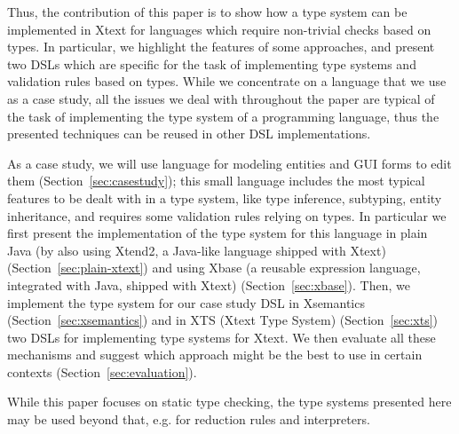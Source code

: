 Thus, the contribution of this paper is to show how a type system can be
implemented in Xtext for languages  which require non-trivial checks based on types. In particular, we
highlight the features of some approaches, and present two DSLs which are
specific for the task of implementing type systems and validation rules based on
types.   While we concentrate on a language that we use as a case study, all the
issues we deal with throughout the paper are typical of the task of implementing
the type system of a programming language, thus the presented techniques can be
reused in other DSL implementations. 

As a case study, we will use language for modeling entities and GUI forms to
edit them (Section~\ref{sec:casestudy}); this small language includes the most
typical features to be dealt with in a type system, like type inference,
subtyping, entity inheritance, and requires some validation rules relying on
types.  In particular we first present the implementation of the type system for
this language in plain Java (by also using Xtend2, a Java-like language shipped
with Xtext) (Section~\ref{sec:plain-xtext}) and using Xbase (a reusable
expression language, integrated with Java, shipped with Xtext)
(Section~\ref{sec:xbase}). 
Then, we implement the type system for our case study DSL in Xsemantics
(Section~\ref{sec:xsemantics}) and in XTS (Xtext Type System)
(Section~\ref{sec:xts}) two DSLs for implementing type systems for Xtext.
We then evaluate all these mechanisms and suggest which approach might be the
best to use in certain contexts (Section~\ref{sec:evaluation}).

While this paper focuses on static type checking, the type systems presented
here may be used beyond that, e.g. for reduction rules and interpreters.  


